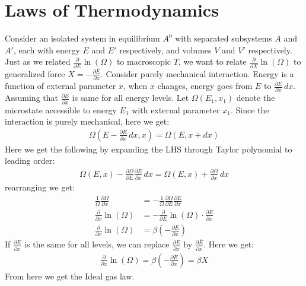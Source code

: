 \documentclass[11pt,oneside]{book}
\theoremstyle{break}
\theoremstyle{break}
\newcommand{\lr}[1]{\left( #1 \right)}
\begin{document}
\section[Laws of Thermodynamics]{\color{red} Laws of Thermodynamics\color{black}}
Consider an isolated system in equilibrium $A^0$ with separated subsystems $A$ and $A'$, each with energy $E$ and $E'$ respectively, and volumes $V$ and $V'$ respectively. Just as we related $\frac{\partial }{\partial E}\ln (\Omega)$ to macroscopic $T$, we want to relate $\frac{\partial}{\partial X}\ln(\Omega)$ to generalized force $X = -\frac{\partial \bar{E}}{\partial x}$. Consider purely mechanical interaction. Energy is a function of external parameter $x$, when $x$ changes, energy goes from $E$ to $\frac{\partial E}{\partial x} \, dx$. Assuming that $\frac{\partial E}{\partial x}$ is same for all energy levels. Let $\Omega(E_1,x_1)$ denote the microstate accessible to energy $E_1$ with external parameter $x_1$. Since the interaction is purely mechanical, here we get:
\begin{align*}
\Omega\lr{E- \frac{\partial E}{\partial x}\, dx, x} = \Omega(E, x + dx)
\end{align*}  
Here we get the following by expanding the LHS through Taylor polynomial to leading order:
\begin{align*}
\Omega(E, x) - \frac{\partial \Omega}{\partial E} \frac{\partial E}{\partial x}\, dx = \Omega(E,x) + \frac{\partial\Omega}{\partial x}\, dx
\end{align*}
rearranging we get:
\begin{align*}
\frac{1}{\Omega}\frac{\partial \Omega}{\partial x} &= -\frac{1}{\Omega}\frac{\partial \Omega}{\partial E}\frac{\partial E}{\partial x}\\
\frac{\partial }{\partial x}\ln(\Omega) &= - \frac{\partial }{\partial E}\ln(\Omega) \cdot \frac{\partial E}{\partial x}\\
\frac{\partial}{\partial x}\ln(\Omega)&= \beta\left(-\frac{\partial E}{\partial x}\right)
\end{align*}
If $\frac{\partial E}{\partial x}$ is the same for all levels, we can replace $\frac{\partial E}{\partial x}$ by $\frac{\partial \bar{E}}{\partial x}$. 
Here we get:
\begin{align*}
\frac{\partial}{\partial x}\ln (\Omega) = \beta\left(-\frac{\partial\bar{E}}{\partial x}\right) = \beta X
\end{align*}
From here we get the Ideal gas law.\\
\end{document}
